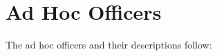 %
%
%

\section{Ad Hoc Officers}\label{sec:AdHocOfficers}
The ad hoc officers and their descriptions follow:\\


